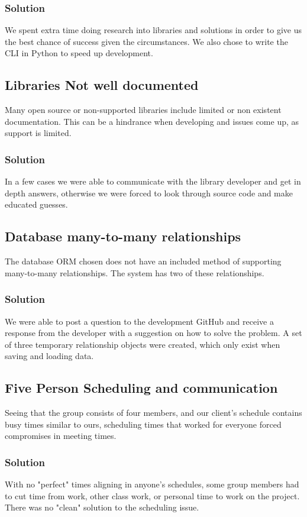 \documentclass[onecolumn, draftclsnofoot,10pt, compsoc]{IEEEtran}
\begin{document}
		\subsubsection{Solution}
			We spent extra time doing research into libraries and solutions in order to give us the best chance of success given the circumstances. We also chose to write the CLI in Python to speed up development.
	\subsection{Libraries Not well documented}
      Many open source or non-supported libraries include limited or non existent documentation.
			This can be a hindrance when developing and issues come up, as support is limited.
  	\subsubsection{Solution}
	    In a few cases we were able to communicate with the library developer and get in depth answers,
			otherwise we were forced to look through source code and make educated guesses.
	\subsection{Database many-to-many relationships}
      The database ORM chosen does not have an included method of supporting many-to-many relationships.
			The system has two of these relationships.
  	\subsubsection{Solution}
	    We were able to post a question to the development GitHub and receive a response from the developer with a suggestion on how to solve the problem. A set of three temporary relationship objects were created, which only exist when saving and loading data.
	\subsection{Five Person Scheduling and communication}
		 Seeing that the group consists of four members, and our client's schedule contains busy times similar to ours, scheduling times that worked for everyone
		 forced compromises in meeting times.
  	\subsubsection{Solution}
		  With no "perfect" times aligning in anyone's schedules, some group members had to cut time from work, other class work, or personal time to work on the project.
		  There was no "clean" solution to the scheduling issue.
\end{document}
